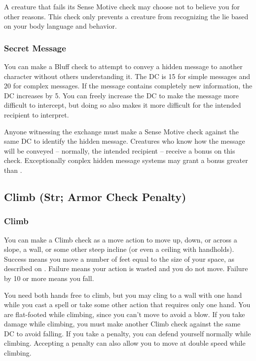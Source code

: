 A creature that fails its Sense Motive check may choose not to believe you for other reasons. This check only prevents a creature from recognizing the lie based on your body language and behavior.

\subsubsection{Secret Message}
You can make a Bluff check to attempt to convey a hidden message to another character without others understanding it. The DC is 15 for simple messages and 20 for complex messages. If the message contains completely new information, the DC increases by 5. You can freely increase the DC to make the message more difficult to intercept, but doing so also makes it more difficult for the intended recipient to interpret.

Anyone witnessing the exchange must make a Sense Motive check against the same DC to identify the hidden message. Creatures who know how the message will be conveyed -- normally, the intended recipient -- receive a  bonus on this check. Exceptionally conplex hidden message systems may grant a bonus greater than .

\subsection{Climb (Str; Armor Check Penalty)}

\subsubsection{Climb}
You can make a Climb check as a move action to move up, down, or across a slope, a wall, or some other steep incline (or even a ceiling with handholds). Success means you move a number of feet equal to the size of your space, as described on . Failure means your action is wasted and you do not move. Failure by 10 or more means you fall.

You need both hands free to climb, but you may cling to a wall with one hand while you cast a spell or take some other action that requires only one hand. You are flat-footed while climbing, since you can't move to avoid a blow. If you take damage while climbing, you must make another Climb check against the same DC to avoid falling. If you take a  penalty, you can defend yourself normally while climbing. Accepting a  penalty can also allow you to move at double speed while climbing. 


